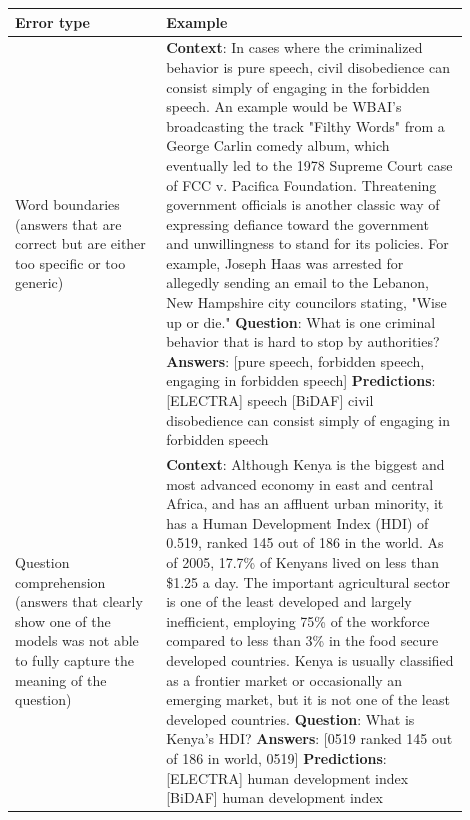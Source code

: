 \documentclass[a4paper,10pt]{report}
\begin{document}
\begin{longtable}{m{0.30\linewidth}|m{0.6\linewidth}}
  \textbf{Error type} & \textbf{Example} \\ \hline \endhead
  Word boundaries \newline \small{(answers that are correct but are either too specific or too generic)} & \textbf{Context}: In cases where the criminalized behavior is pure speech, civil disobedience can consist simply of engaging in the forbidden speech. An example would be WBAI's broadcasting the track "Filthy Words" from a George Carlin comedy album, which eventually led to the 1978 Supreme Court case of FCC v. Pacifica Foundation. Threatening government officials is another classic way of expressing defiance toward the government and unwillingness to stand for its policies. For example, Joseph Haas was arrested for allegedly sending an email to the Lebanon, New Hampshire city councilors stating, "Wise up or die." \newline
  \textbf{Question}: What is one criminal behavior that is hard to stop by authorities? \newline
  \textbf{Answers}: [pure speech, forbidden speech, engaging in forbidden speech] \newline
  \textbf{Predictions}: [ELECTRA] speech [BiDAF] civil disobedience can consist simply of engaging in forbidden speech \\ \hline
  Question comprehension \newline \small{(answers that clearly show one of the models was not able to fully capture the meaning of the question)} & \textbf{Context}: Although Kenya is the biggest and most advanced economy in east and central Africa, and has an affluent urban minority, it has a Human Development Index (HDI) of 0.519, ranked 145 out of 186 in the world. As of 2005, 17.7\% of Kenyans lived on less than \$1.25 a day. The important agricultural sector is one of the least developed and largely inefficient, employing 75\% of the workforce compared to less than 3\% in the food secure developed countries. Kenya is usually classified as a frontier market or occasionally an emerging market, but it is not one of the least developed countries. \newline
  \textbf{Question}: What is Kenya's HDI? \newline
  \textbf{Answers}: [0519 ranked 145 out of 186 in world, 0519] \newline
  \textbf{Predictions}: [ELECTRA] human development index [BiDAF] human development index \\ \hline

\end{longtable}
\end{document}
